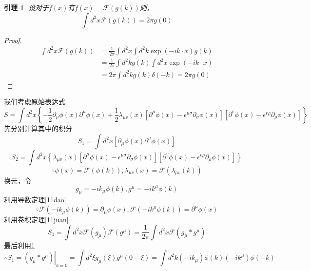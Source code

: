 \documentclass[a4paper]{ctexart}
\newtheorem{yinli}[subsection]{引理}
\begin{document}
\begin{yinli}\label{11delta}
    设对于$f(x)$有$f(x)=\mathcal{F}(g(k))$则，
    $$
        \int{d^2x\mathcal{F}\left( g\left( k \right) \right) }=2\pi g\left( 0 \right)
    $$
\end{yinli}
\begin{proof}
    $$
        \begin{aligned}
            \int{d^2x\mathcal{F}\left( g\left( k \right) \right)}
             & = \frac{1}{2\pi} \int{d^2x}\int{d^2k\exp \left( -ik\cdot x \right) g\left( k \right)} \\
             & =\frac{1}{2\pi} \int{d^2kg\left( k \right)}\int{d^2x\exp \left( -ik\cdot x \right)}   \\
             & =2 \pi \int{d^2kg\left( k \right) \delta \left( -k \right) =}2 \pi g\left( 0 \right)
        \end{aligned}
    $$

\end{proof}
我们考虑原始表达式
$$
    S=\int{d}^2x\left\{ -\frac{1}{2}\partial _{\mu}\phi \left( x \right) \partial ^{\mu}\phi \left( x \right) +\frac{1}{2}\lambda _{\mu v}\left( x \right) \left[ \partial ^{\mu}\phi \left( x \right) -\epsilon ^{\mu \sigma}\partial _{\sigma}\phi \left( x \right) \right] \left[ \partial ^v\phi \left( x \right) -\epsilon ^{v\rho}\partial _{\rho}\phi \left( x \right) \right] \right\}
$$
先分别计算其中的积分
$$
    S_1=\int{d}^2x\left[ \partial _{\mu}\phi \left( x \right) \partial ^{\mu}\phi \left( x \right) \right]
$$
$$
    S_2=\int{d}^2x\left\{ \lambda _{\mu v}\left( x \right) \left[ \partial ^{\mu}\phi \left( x \right) -\epsilon ^{\mu \sigma}\partial _{\sigma}\phi \left( x \right) \right] \left[ \partial ^v\phi \left( x \right) -\epsilon ^{v\rho}\partial _{\rho}\phi \left( x \right) \right] \right\}
$$
$$
    \because \phi \left( x \right) =\mathcal{F}\left( \phi \left( k \right) \right) ,\lambda _{\mu v}\left( x \right) =\mathcal{F}\left( \lambda _{\mu v}\left( k \right) \right)
$$
换元，令
$$
    g_{\mu}=-ik_{\mu}\phi \left( k \right) ,g^{\mu}=-ik^{\mu}\phi \left( k \right)
$$
利用导数定理\ref{11dao}
$$
    \because \mathcal{F}\left( -ik_{\mu}\phi \left( k \right) \right) =\partial _{\mu}\phi \left( x \right) ,\mathcal{F}\left( -ik^{\mu}\phi \left( k \right) \right) =\partial ^{\mu}\phi \left( x \right)
$$
利用卷积定理\ref{11juan}
$$
    S_1=\int{d}^2x\mathcal{F}\left( g_{\mu} \right) \mathcal{F}\left( g^{\mu} \right) =\frac{1}{2\pi}\int{d}^2x\mathcal{F}\left( g_{\mu}*g^{\mu} \right)
$$
最后利用\ref{11delta}
$$
    \therefore S_1=\left. \left( g_{\mu}*g^{\mu} \right) \right|_{k=0}=\int{d}^2\xi g_{\mu}\left( \xi \right) g^{\mu}\left( 0-\xi \right) =\int{d}^2k\left( -ik_{\mu} \right) \phi \left( k \right) \left( -ik^{\mu} \right) \phi \left( -k \right)
$$
\end{document}
